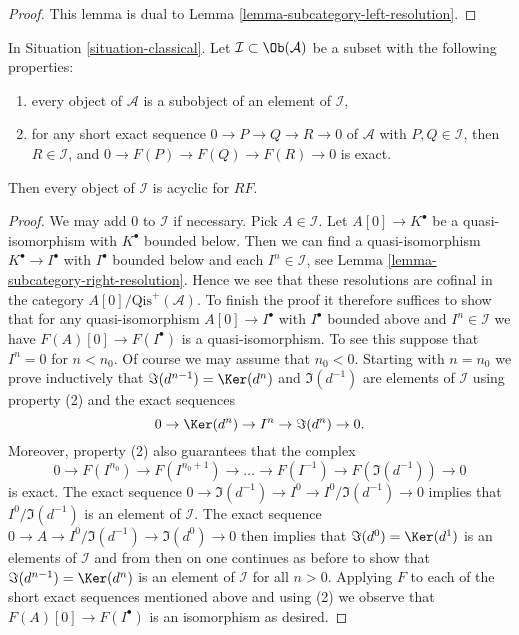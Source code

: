 \begin{proof}
This lemma is dual to Lemma \ref{lemma-subcategory-left-resolution}.
\end{proof}

\begin{lemma}
\label{lemma-subcategory-right-acyclics}
In
Situation \ref{situation-classical}.
Let $\mathcal{I} \subset \Ob(\mathcal{A})$ be a subset with the
following properties:
\begin{enumerate}
\item every object of $\mathcal{A}$ is a subobject of an element of
$\mathcal{I}$,
\item for any short exact sequence $0 \to P \to Q \to R \to 0$ of
$\mathcal{A}$ with $P, Q \in \mathcal{I}$, then $R \in \mathcal{I}$,
and $0 \to F(P) \to F(Q) \to F(R) \to 0$ is exact.
\end{enumerate}
Then every object of $\mathcal{I}$ is acyclic for $RF$.
\end{lemma}

\begin{proof}
We may add $0$ to $\mathcal{I}$ if necessary. Pick $A \in \mathcal{I}$.
Let $A[0] \to K^\bullet$ be a quasi-isomorphism with $K^\bullet$
bounded below. Then we can find a quasi-isomorphism
$K^\bullet \to I^\bullet$ with $I^\bullet$ bounded below and
each $I^n \in \mathcal{I}$, see
Lemma \ref{lemma-subcategory-right-resolution}.
Hence we see that these resolutions are cofinal in the category
$A[0]/\text{Qis}^{+}(\mathcal{A})$. To finish the proof it therefore
suffices to show that for any quasi-isomorphism
$A[0] \to I^\bullet$ with $I^\bullet$ bounded above and $I^n \in \mathcal{I}$
we have $F(A)[0] \to F(I^\bullet)$ is a quasi-isomorphism.
To see this suppose that $I^n = 0$ for $n < n_0$. Of course we may assume
that $n_0 < 0$. Starting with $n = n_0$ we prove inductively that
$\Im(d^{n - 1}) = \Ker(d^n)$ and $\Im(d^{-1})$
are elements of $\mathcal{I}$ using property (2) and the exact sequences
$$
0 \to \Ker(d^n) \to I^n \to \Im(d^n) \to 0.
$$
Moreover, property (2) also guarantees that the complex
$$
0 \to F(I^{n_0}) \to F(I^{n_0 + 1}) \to \ldots \to F(I^{-1}) \to
F(\Im(d^{-1})) \to 0
$$
is exact. The exact sequence
$0 \to \Im(d^{-1}) \to I^0 \to I^0/\Im(d^{-1}) \to 0$
implies that $I^0/\Im(d^{-1})$ is an element of $\mathcal{I}$.
The exact sequence $0 \to A \to I^0/\Im(d^{-1}) \to \Im(d^0) \to 0$
then implies that $\Im(d^0) = \Ker(d^1)$ is an elements of
$\mathcal{I}$ and from then on one continues as before to show that
$\Im(d^{n - 1}) = \Ker(d^n)$ is an element of $\mathcal{I}$
for all $n > 0$. Applying $F$ to each of the short exact sequences
mentioned above and using (2) we observe that $F(A)[0] \to F(I^\bullet)$
is an isomorphism as desired.
\end{proof}

